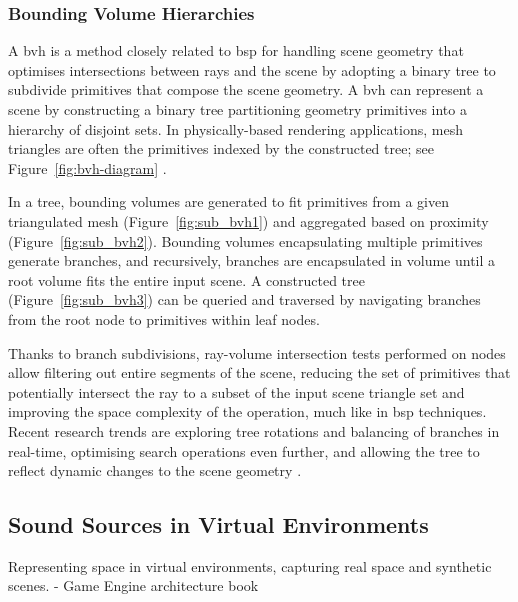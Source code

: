 \subsubsection{Bounding Volume Hierarchies}
A \acrfull{bvh} is a method closely related to \acrshort{bsp} for handling scene geometry that optimises intersections between rays and the scene by adopting a binary tree to subdivide primitives that compose the scene geometry. A \acrshort{bvh} can represent a scene by constructing a binary tree partitioning geometry primitives into a hierarchy of disjoint sets. In physically-based rendering applications, mesh triangles are often the primitives indexed by the constructed tree; see Figure~\ref{fig:bvh-diagram} \citep{pharr2023physically}.\par
In a tree, bounding volumes are generated to fit primitives from a given triangulated mesh (Figure~\ref{fig:sub_bvh1}) and aggregated based on proximity (Figure~\ref{fig:sub_bvh2}). Bounding volumes encapsulating multiple primitives generate branches, and recursively, branches are encapsulated in volume until a root volume fits the entire input scene. A constructed tree (Figure~\ref{fig:sub_bvh3}) can be queried and traversed by navigating branches from the root node to primitives within leaf nodes.\par
Thanks to branch subdivisions, ray-volume intersection tests performed on nodes allow filtering out entire segments of the scene, reducing the set of primitives that potentially intersect the ray to a subset of the input scene triangle set and improving the space complexity of the operation, much like in \acrshort{bsp} techniques. Recent research trends are exploring tree rotations and balancing of branches in real-time, optimising search operations even further, and allowing the tree to reflect dynamic changes to the scene geometry \citep{kopta2012fast}.
 
\subsection{Sound Sources in Virtual Environments}
Representing space in virtual environments, capturing real space and synthetic scenes.
- Game Engine architecture book                             

